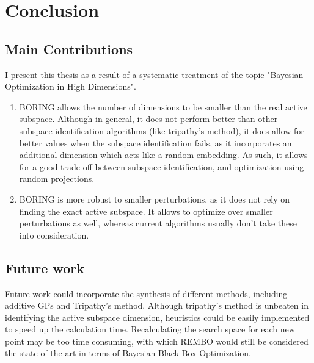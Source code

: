 \chapter{Conclusion}

\ifpdf
    \graphicspath{{Chapter7/Figs/Raster/}{Chapter7/Figs/PDF/}{Chapter7/Figs/}}
\else
    \graphicspath{{Chapter7/Figs/Vector/}{Chapter7/Figs/}}
\fi

\section{Main Contributions}
I present this thesis as a result of a systematic treatment of the topic "Bayesian Optimization in High Dimensions".

\begin{enumerate}
\item BORING allows the number of dimensions to be smaller than the real active subspace.
Although in general, it does not perform better than other subspace identification algorithms (like tripathy's method), it does allow for better values when the subspace identification fails, as it incorporates an additional dimension which acts like a random embedding.
As such, it allows for a good trade-off between subspace identification, and optimization using random projections.
\item BORING is more robust to smaller perturbations, as it does not rely on finding the exact active subspace.
It allows to optimize over smaller perturbations as well, whereas current algorithms usually don't take these into consideration.
\end{enumerate}

\section{Future work}

Future work could incorporate the synthesis of different methods, including additive GPs and Tripathy's method.
Although tripathy's method is unbeaten in identifying the active subspace dimension, heuristics could be easily implemented to speed up the calculation time.
Recalculating the search space for each new point may be too time consuming, with which REMBO would still be considered the state of the art in terms of Bayesian Black Box Optimization.
 



